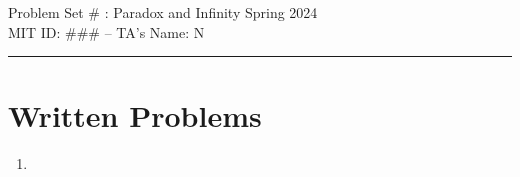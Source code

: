\documentclass[12pt]{article}
\begin{document}
\begin{center}
{\Large  Problem Set}
{\Large \#} %
{\Large\!: Paradox and Infinity Spring 2024}\\ {\large MIT ID:}
{\large \#\#\#} %
{\large -- TA's Name:}
{\large N} %
\end{center}
\hrule
\vspace{3mm}






\section*{Written Problems}

\begin{enumerate}

\item 

\end{enumerate}
\end{document}
